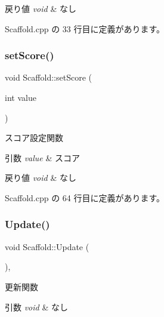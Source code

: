 \begin{DoxyRetVals}{戻り値}
{\em void} & なし \\
\hline
\end{DoxyRetVals}


 Scaffold.\+cpp の 33 行目に定義があります。

\mbox{\label{class_scaffold_a6e5a9d4c75b48b31e265c30e2c9712a4}} 
\subsubsection{\texorpdfstring{set\+Score()}{setScore()}}
{\footnotesize\ttfamily void Scaffold\+::set\+Score (\begin{DoxyParamCaption}\item[{int}]{value }\end{DoxyParamCaption})}



スコア設定関数 


\begin{DoxyParams}{引数}
{\em value} & スコア \\
\hline
\end{DoxyParams}

\begin{DoxyRetVals}{戻り値}
{\em void} & なし \\
\hline
\end{DoxyRetVals}


 Scaffold.\+cpp の 64 行目に定義があります。

\mbox{\label{class_scaffold_a0799d380645a9d4e92dfd90f6bb6f9e9}} 
\subsubsection{\texorpdfstring{Update()}{Update()}}
{\footnotesize\ttfamily void Scaffold\+::\+Update (\begin{DoxyParamCaption}{ }\end{DoxyParamCaption})\hspace{0.3cm}{\ttfamily [override]}, {\ttfamily [virtual]}}



更新関数 


\begin{DoxyParams}{引数}
{\em void} & なし \\
\hline
\end{DoxyParams}

